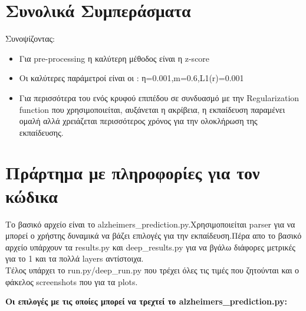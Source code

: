 \documentclass[a4paper,11pt]{article}
\begin{document}
\section{Συνολικά Συμπεράσματα}
 Συνοψίζοντας:
\begin{itemize}
    \item Για pre-processing η καλύτερη μέθοδος είναι η z-score
    \item Οι καλύτερες παράμετροί είναι οι : η=0.001,m=0.6,L1(r)=0.001
    \item Για περισσότερα του ενός κρυφού επιπέδου σε συνδυασμό με την Regularization function που χρησιμοποιείται, αυξάνεται η ακρίβεια, η εκπαίδευση παραμένει ομαλή 
    αλλά χρειάζεται περισσότερος χρόνος για την ολοκλήρωση της εκπαίδευσης.
\end{itemize}

\newpage
\section{Πράρτημα με πληροφορίες για τον κώδικα}
Το βασικό αρχείο είναι το alzheimers\_prediction.py.Χρησιμοποιείται parser για να μπορεί ο χρήστης δυναμικά να βάζει επιλογές για την εκπαίδευση.Πέρα απο το βασικό αρχείο 
υπάρχουν τα results.py και deep\_results.py για να βγάλω διάφορες μετρικές για το 1 και τα πολλά layers αντίστοιχα.\\
Τέλος υπάρχει το run.py/deep\_run.py που τρέχει όλες τις τιμές που ζητούνται και ο φάκελος screenshots που για τα plots.

\vspace{4em}
\textbf{Οι επιλογές με τις οποίες μπορεί να τρεχτεί το alzheimers\_prediction.py:}
\end{document}
